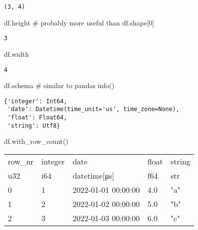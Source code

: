 \documentclass[
  letterpaper,
  DIV=11,
  numbers=noendperiod]{scrartcl}
\newenvironment{Shaded}{\begin{snugshade}}{\end{snugshade}}
\newcommand{\CommentTok}[1]{\textcolor[rgb]{0.37,0.37,0.37}{#1}}
\newcommand{\NormalTok}[1]{\textcolor[rgb]{0.00,0.23,0.31}{#1}}
\begin{document}
\begin{verbatim}
(3, 4)
\end{verbatim}

\begin{Shaded}
\begin{Highlighting}[]
\NormalTok{df.height }\CommentTok{\# probably more useful than df.shape[0]}
\end{Highlighting}
\end{Shaded}

\begin{verbatim}
3
\end{verbatim}

\begin{Shaded}
\begin{Highlighting}[]
\NormalTok{df.width}
\end{Highlighting}
\end{Shaded}

\begin{verbatim}
4
\end{verbatim}

\begin{Shaded}
\begin{Highlighting}[]
\NormalTok{df.schema }\CommentTok{\# similar to pandas info()}
\end{Highlighting}
\end{Shaded}

\begin{verbatim}
{'integer': Int64,
 'date': Datetime(time_unit='us', time_zone=None),
 'float': Float64,
 'string': Utf8}
\end{verbatim}

\begin{Shaded}
\begin{Highlighting}[]
\NormalTok{df.with\_row\_count()}
\end{Highlighting}
\end{Shaded}

\begin{longtable}[]{@{}lllll@{}}
\toprule()
row\_nr & integer & date & float & string \\
u32 & i64 & datetime{[}μs{]} & f64 & str \\
\midrule()
\endhead
0 & 1 & 2022-01-01 00:00:00 & 4.0 & "a" \\
1 & 2 & 2022-01-02 00:00:00 & 5.0 & "b" \\
2 & 3 & 2022-01-03 00:00:00 & 6.0 & "c" \\
\bottomrule()
\end{longtable}
\end{document}
